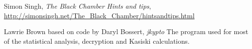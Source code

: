 \documentclass{article}
\begin{document}
      \begin{thebibliography}{9}
          Simon Singh,
          \textit{The Black Chamber \- Hints and tips},
          \url{http://simonsingh.net/The_Black_Chamber/hintsandtips.html}

          Lawrie Brown based on code by Daryl Bossert,
          \textit{jkypto}
          The program used for most of the statistical analysis, decryption and Kasiski calculations.

      \end{thebibliography}
  
\end{document}
